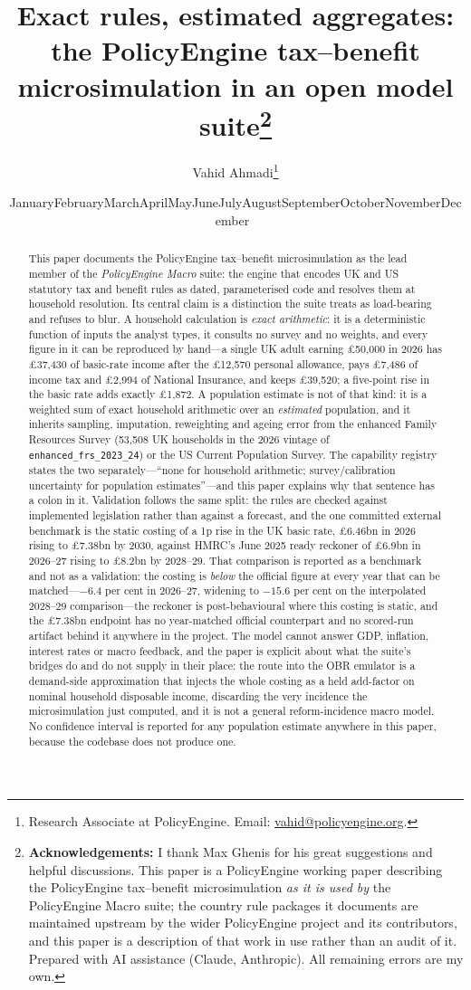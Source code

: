 \documentclass[11pt]{article}
\title{\bfseries Exact rules, estimated aggregates: the PolicyEngine tax--benefit microsimulation in an open model suite\thanks{\textbf{Acknowledgements:} I thank Max Ghenis for his great suggestions and helpful discussions. This paper is a PolicyEngine working paper describing the PolicyEngine tax--benefit microsimulation \emph{as it is used by} the PolicyEngine Macro suite; the country rule packages it documents are maintained upstream by the wider PolicyEngine project and its contributors, and this paper is a description of that work in use rather than an audit of it. Prepared with AI assistance (Claude, Anthropic). All remaining errors are my own.}\\[0.7cm]}
\author{Vahid Ahmadi\thanks{Research Associate at PolicyEngine. Email: \href{mailto:vahid@policyengine.org}{vahid@policyengine.org}.}}
\date{\small \ifcase\month\or January\or February\or March\or April\or May\or June\or July\or August\or September\or October\or November\or December\fi\ \the\year}
\begin{document}
\maketitle

\begin{abstract}
\noindent This paper documents the PolicyEngine tax--benefit microsimulation as the lead member of the \emph{PolicyEngine Macro} suite: the engine that encodes UK and US statutory tax and benefit rules as dated, parameterised code and resolves them at household resolution. Its central claim is a distinction the suite treats as load-bearing and refuses to blur. A household calculation is \emph{exact arithmetic}: it is a deterministic function of inputs the analyst types, it consults no survey and no weights, and every figure in it can be reproduced by hand---a single UK adult earning \pounds 50{,}000 in 2026 has \pounds 37{,}430 of basic-rate income after the \pounds 12{,}570 personal allowance, pays \pounds 7{,}486 of income tax and \pounds 2{,}994 of National Insurance, and keeps \pounds 39{,}520; a five-point rise in the basic rate adds exactly \pounds 1{,}872. A population estimate is not of that kind: it is a weighted sum of exact household arithmetic over an \emph{estimated} population, and it inherits sampling, imputation, reweighting and ageing error from the enhanced Family Resources Survey (53{,}508 UK households in the 2026 vintage of \texttt{enhanced\_frs\_2023\_24}) or the US Current Population Survey. The capability registry states the two separately---``none for household arithmetic; survey/calibration uncertainty for population estimates''---and this paper explains why that sentence has a colon in it. Validation follows the same split: the rules are checked against implemented legislation rather than against a forecast, and the one committed external benchmark is the static costing of a 1p rise in the UK basic rate, \pounds 6.46bn in 2026 rising to \pounds 7.38bn by 2030, against HMRC's June 2025 ready reckoner of \pounds 6.9bn in 2026--27 rising to \pounds 8.2bn by 2028--29. That comparison is reported as a benchmark and not as a validation: the costing is \emph{below} the official figure at every year that can be matched---$-6.4$ per cent in 2026--27, widening to $-15.6$ per cent on the interpolated 2028--29 comparison---the reckoner is post-behavioural where this costing is static, and the \pounds 7.38bn endpoint has no year-matched official counterpart and no scored-run artifact behind it anywhere in the project. The model cannot answer GDP, inflation, interest rates or macro feedback, and the paper is explicit about what the suite's bridges do and do not supply in their place: the route into the OBR emulator is a demand-side approximation that injects the whole costing as a held add-factor on nominal household disposable income, discarding the very incidence the microsimulation just computed, and it is not a general reform-incidence macro model. No confidence interval is reported for any population estimate anywhere in this paper, because the codebase does not produce one.
\end{abstract}
\end{document}
